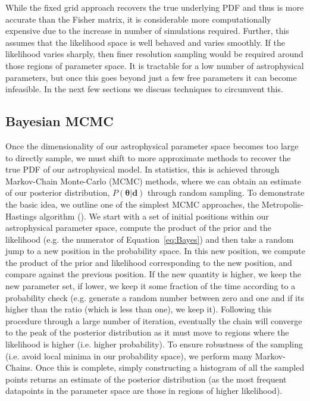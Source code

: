 While the fixed grid approach recovers the true underlying PDF and thus is more accurate than the Fisher matrix, it is considerable more computationally expensive due to the increase in number of simulations required. Further, this assumes that the likelihood space is well behaved and varies smoothly. If the likelihood varies sharply, then finer resolution sampling would be required around those regions of parameter space. It is tractable for a low number of astrophysical parameters, but once this goes beyond just a few free parameters it can become infeasible. In the next few sections we discuss techniques to circumvent this.

\subsection{Bayesian MCMC} \label{sec:MCMC}

Once the dimensionality of our astrophysical parameter space becomes too large to directly sample, we must shift to more approximate methods to recover the true PDF of our astrophysical model. In statistics, this is achieved through Markov-Chain Monte-Carlo (MCMC) methods, where we can obtain an estimate of our posterior distribution, $P(\mathbf{\theta}|\mathbf{d})$ through random sampling. To demonstrate the basic idea, we outline one of the simplest MCMC approaches, the Metropolis-Hastings algorithm (\cite{Metropolis:1953,Hastings:1970}). We start with a set of initial positions within our astrophysical parameter space, compute the product of the prior and the likelihood (e.g. the numerator of Equation~\ref{eq:Bayes}) and then take a random jump to a new position in the probability space. In this new position, we compute the product of the prior and likelihood corresponding to the new position, and compare against the previous position. If the new quantity is higher, we keep the new parameter set, if lower, we keep it some fraction of the time according to a probability check (e.g. generate a random number between zero and one and if its higher than the ratio (which is less than one), we keep it). Following this procedure through a large number of iteration, eventually the chain will converge to the peak of the posterior distribution as it must move to regions where the likelihood is higher (i.e. higher probability). To ensure robustness of the sampling (i.e. avoid local minima in our probability space), we perform many Markov-Chains. Once this is complete, simply constructing a histogram of all the sampled points returns an estimate of the posterior distribution (as the most frequent datapoints in the parameter space are those in regions of higher likelihood).

